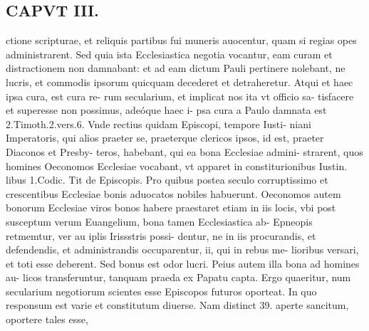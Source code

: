 \documentclass{article}
\begin{document}
\begin{pages}
\section*{CAPVT  III. }
\marginpar{[ p.151 ]}\pstart ctione scripturae, et reliquis partibus fui muneris auocentur, quam si regias opes administrarent. Sed quia ista Ecclesiastica negotia vocantur, eam curam et distractionem non damnabant: et ad eam dictum Pauli pertinere nolebant, ne lucris, et commodis ipsorum quicquam decederet et detraheretur. Atqui et haec ipsa cura, est cura re- rum secularium, et implicat nos ita vt officio sa- tisfacere et superesse non possimus, adeóque  haec i- psa cura a Paulo damnata est 2.Timoth.2.vers.6. Vnde rectius quidam Episcopi, tempore Iusti- niani Imperatoris, qui alios praeter se, praeterque clericos ipsos, id est, praeter Diaconos et Presby- teros, habebant, qui ea bona Ecclesiae admini- strarent, quos homines Oeconomos Ecclesiae vocabant, vt apparet in constiturionibus Iustin. libus 1.Codic. Tit de Episcopis. Pro quibus postea seculo corruptissimo et crescentibus Ecclesiae bonis aduocatos nobiles habuerunt. Oeconomos autem bonorum Ecclesiae viros bonos habere praestaret etiam in iis locis, vbi post susceptum verum Euangelium, bona tamen Ecclesiastica ab- Epneopis retmemtur, ver au iplis Irissstris possi- dentur, ne in iis procurandis, et defendendis, et administrandis occuparentur, ii, qui in rebus me- lioribus versari, et toti esse deberent. Sed bonus est odor lucri. Peius autem illa bona ad homines au- licos transferuntur, tanquam praeda ex Papatu capta.  \pend\pstart Ergo quaeritur, num secularium negotiorum scientes esse Episcopos futuros oporteat. In quo responsum est varie et constitutum diuerse. Nam distinct 39. aperte sancitum, oportere tales esse,  \pend

\end{pages}
\end{document}
